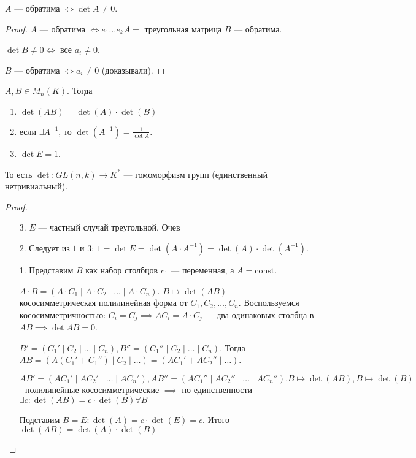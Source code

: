 \begin{theorem}
    $A$ --- обратима  $\iff \det A \neq 0$.
\end{theorem}
\begin{proof}
    $A$ --- обратима  $\iff e_1\ldots e_kA =$ треугольная матрица $B$ --- обратима.

    $\det B \neq 0 \iff $ все $a_i \neq 0$.

     $B$ --- обратима  $\iff a_i \neq 0$ (доказывали).
\end{proof}
\begin{theorem}
    $A, B \in M_n(K)$. Тогда 
     \begin{enumerate}
         \item $\det(AB) = \det(A) \cdot \det(B)$
         \item если  $\exists A^{-1}$, то  $\det(A^{-1}) = \frac{1}{\det A}$.
         \item $\det E = 1$.
    \end{enumerate}
    То есть $\det\!: GL(n, k) \to K^*$ --- гомоморфизм групп (единственный нетривиальный).
\end{theorem}
\begin{proof}
    \begin{enumerate}
        \item[3.] $E$ --- частный случай треугольной. Очев
        \item[2.] Следует из $1$ и 3:  $1 = \det E = \det(A \cdot A^{-1}) = \det(A) \cdot \det(A^{-1})$.
        \item[1.] Представим  $B$ как набор столбцов $c_1$ --- переменная, а $A = \text{const}$.

             $A \cdot B = \left(A \cdot C_1 \mid A \cdot C_2 \mid \ldots \mid A \cdot C_n\right)$. $B \mapsto \det(AB)$ --- кососимметрическая полилинейная форма от  $C_1, C_2, \ldots, C_n$. Воспользуемся кососимметричностью: $C_i = C_j \implies A C_i = A\cdot C_j$ --- два одинаковых столбца в  $AB \implies \det AB = 0$.

              $B' = (C_1' \mid C_2 \mid \ldots \mid C_n), B'' = (C_1'' \mid C_2 \mid \ldots \mid C_n)$. Тогда $AB=(A(C_1' + C_1'') \mid C_2 \mid \ldots) = (AC_1' + AC_2'' \mid \ldots)$.

              $AB' = (AC_1' \mid AC_2' \mid \dots \mid AC_n'), AB'' = (AC_1'' \mid AC_2'' \mid \dots \mid AC_n''). B \mapsto \det(AB), B \mapsto \det(B)$ - полилинейные кососимметрические $\implies$ по единственности $\exists c: \det(AB) = c \cdot \det(B) \forall B$

              Подставим $B = E: \det(A) = c \cdot \det(E) = c$. Итого $\det(AB) = \det(A)\cdot \det(B)$
    \end{enumerate}
\end{proof}
